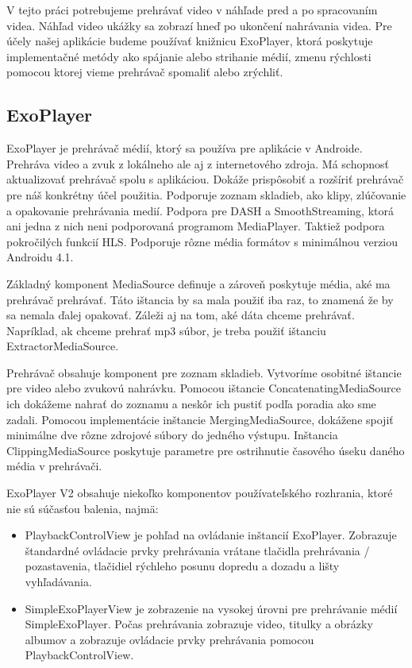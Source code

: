 \documentclass[12pt, oneside]{book}
\begin{document}
\hspace{15pt} V tejto práci potrebujeme prehrávať video v náhľade pred a po spracovaním videa.  Náhľad video ukážky sa zobrazí hneď po ukončení nahrávania videa. Pre účely našej aplikácie budeme používať knižnicu ExoPlayer, ktorá poskytuje implementačné metódy ako spájanie alebo strihanie médií, zmenu rýchlosti pomocou ktorej vieme prehrávač spomaliť alebo zrýchliť.

\subsection{ExoPlayer}

\hspace{15pt} ExoPlayer je prehrávač médií, ktorý sa používa pre aplikácie v Androide. Prehráva video a zvuk z lokálneho ale aj z internetového zdroja. Má schopnosť aktualizovať prehrávač spolu s aplikáciou. Dokáže prispôsobiť a rozšíriť prehrávač pre náš konkrétny účel použitia. Podporuje zoznam skladieb, ako klipy, zlúčovanie a opakovanie prehrávania medií. Podpora pre DASH a SmoothStreaming, ktorá ani jedna z nich neni podporovaná programom MediaPlayer. Taktiež podpora pokročilých funkcií HLS. Podporuje rôzne média formátov s minimálnou verziou Androidu 4.1.\cite{exoplayer}

Základný komponent MediaSource definuje a zároveň poskytuje média, aké ma prehrávač prehrávať. Táto ištancia by sa mala použiť iba raz, to znamená že by sa nemala ďalej opakovať. Záleži aj na tom, aké dáta chceme prehrávať. Napríklad, ak chceme prehrať mp3 súbor, je treba použiť ištanciu ExtractorMediaSource.

Prehrávač obsahuje komponent pre zoznam skladieb. Vytvoríme osobitné ištancie pre video alebo zvukovú nahrávku. Pomocou ištancie ConcatenatingMediaSource ich dokážeme nahrať do zoznamu a neskôr ich pustiť podľa poradia ako sme zadali. Pomocou implementácie inštancie MergingMediaSource, dokážene spojiť minimálne dve rôzne zdrojové súbory do jedného výstupu. Inštancia ClippingMediaSource poskytuje parametre pre ostrihnutie časového úseku daného média v prehrávači.

ExoPlayer V2 obsahuje niekoľko komponentov používateľského rozhrania, ktoré nie sú súčasťou balenia, najmä: 

\begin{itemize}
    \item PlaybackControlView je pohľad na ovládanie inštancií ExoPlayer. Zobrazuje štandardné ovládacie prvky prehrávania vrátane tlačidla prehrávania / pozastavenia, tlačidiel rýchleho posunu dopredu a dozadu a lišty vyhľadávania.
    \item SimpleExoPlayerView je zobrazenie na vysokej úrovni pre prehrávanie médií SimpleExoPlayer. Počas prehrávania zobrazuje video, titulky a obrázky albumov a zobrazuje ovládacie prvky prehrávania pomocou PlaybackControlView.
\end{itemize}
\end{document}

